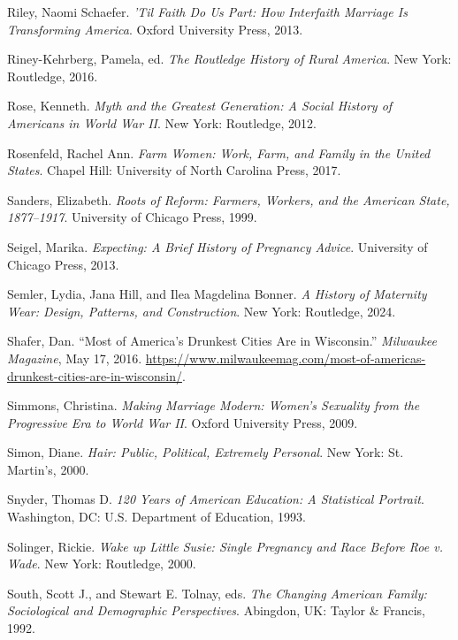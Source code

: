 \documentclass[
  letterpaper,
]{book}
\newlength{\cslhangindent}
\newenvironment{CSLReferences}[2] %
 {\begin{list}{}{%
  \setlength{\itemindent}{0pt}
  \setlength{\leftmargin}{0pt}
  \setlength{\parsep}{0pt}
  \ifodd #1
   \setlength{\leftmargin}{\cslhangindent}
   \setlength{\itemindent}{-1\cslhangindent}
  \fi
  \setlength{\itemsep}{#2\baselineskip}}}
 {\end{list}}
\begin{document}
\begin{CSLReferences}{1}{0}
Riley, Naomi Schaefer. \emph{'Til Faith Do Us Part: How Interfaith
Marriage Is Transforming America}. Oxford University Press, 2013.

Riney-Kehrberg, Pamela, ed. \emph{The Routledge History of Rural
America}. New York: Routledge, 2016.

Rose, Kenneth. \emph{Myth and the Greatest Generation: A Social History
of Americans in World War II}. New York: Routledge, 2012.

Rosenfeld, Rachel Ann. \emph{Farm Women: Work, Farm, and Family in the
United States}. Chapel Hill: University of North Carolina Press, 2017.

Sanders, Elizabeth. \emph{Roots of Reform: Farmers, Workers, and the
American State, 1877--1917}. University of Chicago Press, 1999.

Seigel, Marika. \emph{Expecting: A Brief History of Pregnancy Advice}.
University of Chicago Press, 2013.

Semler, Lydia, Jana Hill, and Ilea Magdelina Bonner. \emph{A History of
Maternity Wear: Design, Patterns, and Construction}. New York:
Routledge, 2024.

Shafer, Dan. {``Most of America's Drunkest Cities Are in Wisconsin.''}
\emph{Milwaukee Magazine}, May 17, 2016.
\url{https://www.milwaukeemag.com/most-of-americas-drunkest-cities-are-in-wisconsin/}.

Simmons, Christina. \emph{Making Marriage Modern: Women's Sexuality from
the Progressive Era to World War II}. Oxford University Press, 2009.

Simon, Diane. \emph{Hair: Public, Political, Extremely Personal}. New
York: St. Martin's, 2000.

Snyder, Thomas D. \emph{120 Years of American Education: A Statistical
Portrait}. Washington, DC: U.S. Department of Education, 1993.

Solinger, Rickie. \emph{Wake up Little Susie: Single Pregnancy and Race
Before Roe v. Wade}. New York: Routledge, 2000.

South, Scott J., and Stewart E. Tolnay, eds. \emph{The Changing American
Family: Sociological and Demographic Perspectives}. Abingdon, UK: Taylor
\& Francis, 1992.


\end{CSLReferences}
\end{document}

